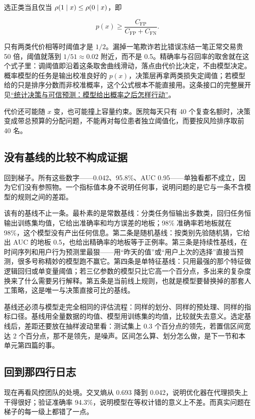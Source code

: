 选正类当且仅当 \(\rho(1\mid x)\le\rho(0\mid x)\)，即

\[
p(x)\ge\frac{C_{\mathrm{FP}}}{C_{\mathrm{FP}}+C_{\mathrm{FN}}} .
\]

只有两类代价相等时阈值才是 \(1/2\)。漏掉一笔欺诈若比错误冻结一笔正常交易贵 50 倍，阈值就落到 \(1/51\approx 0.02\) 附近，而不是 0.5。精确率与召回率的取舍就在这个式子里：调阈值即沿着这条取舍曲线滑动，落点由代价比决定，不由模型决定。概率模型的任务是输出校准良好的 \(p(x)\)，决策层再拿两类损失定阈值；若模型给的只是排序分数而非校准概率，这个公式根本不能直接用。这条接口的完整展开见\hyperref[ch:092]{``统计决策与可信预测：模型给出概率之后怎样行动''}。

代价还可能随 \(x\) 变，也可能撞上容量约束。医院每天只有 40 个复查名额时，决策变成带总预算的分配问题，不能再对每位患者独立阈值化，而要按风险排序取前 40 名。

\subsection{没有基线的比较不构成证据}

回到梯子。所有这些数字——0.042、95.8\%、AUC 0.95——单独看都不成立，因为它们没有参照物。一个指标值本身不说明任何事，说明问题的是它与一条不含模型的规则之间的差距。

该有的基线不止一条。最朴素的是常数基线：分类任务恒输出多数类，回归任务恒输出训练集均值，它给出准确率和均方误差的地板；98\% 准确率若地板就在 98\%，这个模型没有产出任何信息。第二条是随机基线：按类别先验随机猜，它给出 AUC 的地板 0.5，也给出精确率的地板等于正例率。第三条是持续性基线，在时间序列和用户行为预测里最狠——用``昨天的值''或``用户上次的选择''直接当预测，很多号称精妙的模型跑不赢它。第四条是单特征基线：只用最强的那个特征做逻辑回归或单变量阈值；若三亿参数的模型只比它高一个百分点，多出来的复杂度换来了什么需要另行解释。第五条是当前线上规则，也就是模型要替换掉的那套人工策略，这是唯一与决策直接可比的基线。

基线还必须与模型走完全相同的评估流程：同样的划分、同样的预处理、同样的指标口径。基线用全量数据的均值、模型用训练集的均值，比较就失去意义。选定基线后，差距还要放在抽样波动里看：测试集上 0.3 个百分点的领先，若置信区间宽达 2 个百分点，那不是领先，是噪声。区间怎么算、划分怎么做，是下一节和本单元第四篇的事。

\subsection{回到那四行日志}

现在再看风控团队的处境。交叉熵从 0.693 降到 0.042，说明优化器在代理损失上干得很好；验证准确率 94.3\%，说明模型在等权计错的意义上不差。而真实问题在梯子的每一级上都错了一点。

